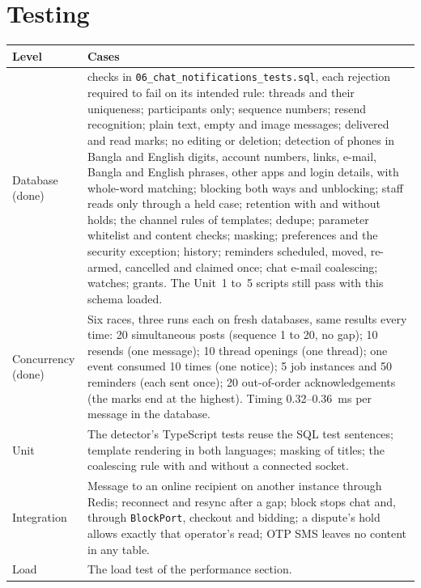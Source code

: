 \documentclass[11pt,a4paper]{article}
\newenvironment{dtable}[1]{\small\begin{longtable}{#1}}{\end{longtable}}
\begin{document}
\section{Testing}
\label{sec:testing}
\begin{dtable}{@{}>{\raggedright\arraybackslash}p{3.2cm}>{\raggedright\arraybackslash}p{12cm}@{}}
\toprule
\textbf{Level} & \textbf{Cases} \\ \midrule \endhead
Database (done) & 69 checks in \texttt{06\_chat\_notifications\_tests.sql}, each rejection required to fail on its intended rule: threads and their uniqueness; participants only; sequence numbers; resend recognition; plain text, empty and image messages; delivered and read marks; no editing or deletion; detection of phones in Bangla and English digits, account numbers, links, e-mail, Bangla and English phrases, other apps and login details, with whole-word matching; blocking both ways and unblocking; staff reads only through a held case; retention with and without holds; the channel rules of templates; dedupe; parameter whitelist and content checks; masking; preferences and the security exception; history; reminders scheduled, moved, re-armed, cancelled and claimed once; chat e-mail coalescing; watches; grants. The Unit~1 to~5 scripts still pass with this schema loaded. \\
Concurrency (done) & Six races, three runs each on fresh databases, same results every time: 20 simultaneous posts (sequence 1 to 20, no gap); 10 resends (one message); 10 thread openings (one thread); one event consumed 10 times (one notice); 5 job instances and 50 reminders (each sent once); 20 out-of-order acknowledgements (the marks end at the highest). Timing 0.32--0.36~ms per message in the database. \\
Unit & The detector's TypeScript tests reuse the SQL test sentences; template rendering in both languages; masking of titles; the coalescing rule with and without a connected socket. \\
Integration & Message to an online recipient on another instance through Redis; reconnect and resync after a gap; block stops chat and, through \texttt{BlockPort}, checkout and bidding; a dispute's hold allows exactly that operator's read; OTP SMS leaves no content in any table. \\
Load & The load test of the performance section. \\
\bottomrule
\end{dtable}
\end{document}
